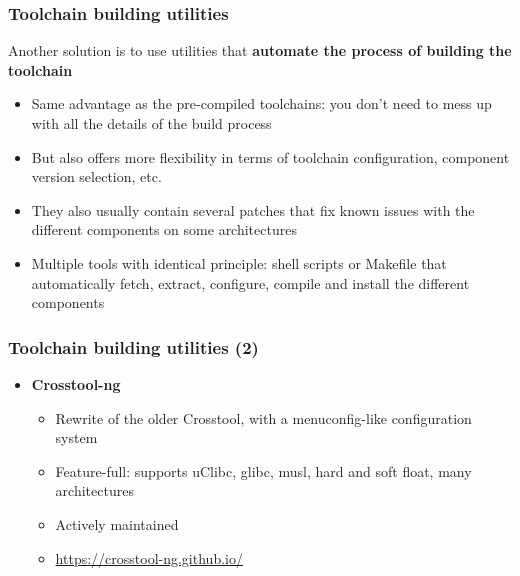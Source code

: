 \begin{frame}
  \frametitle{Toolchain building utilities}
  Another solution is to use utilities that {\bf automate the process of
  building the toolchain}
  \begin{itemize}
  \item Same advantage as the pre-compiled toolchains: you don't need
    to mess up with all the details of the build process
  \item But also offers more flexibility in terms of toolchain
    configuration, component version selection, etc.
  \item They also usually contain several patches that fix known
    issues with the different components on some architectures
  \item Multiple tools with identical principle: shell scripts or
    Makefile that automatically fetch, extract, configure, compile and
    install the different components
\end{itemize}
\end{frame}

\begin{frame}
  \frametitle{Toolchain building utilities (2)}
  \begin{itemize}
  \item {\bf Crosstool-ng}
    \begin{itemize}
    \item Rewrite of the older Crosstool, with a menuconfig-like configuration
      system
    \item Feature-full: supports uClibc, glibc, musl, hard and soft
      float, many architectures
    \item Actively maintained
    \item \url{https://crosstool-ng.github.io/}
    \end{itemize}
  \end{itemize}
\end{frame}

